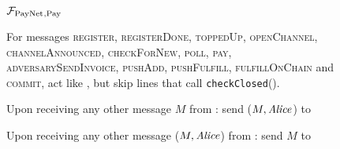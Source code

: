 \begin{figure}[!htbp]
  \begin{systembox}{$\mathcal{F}_{\mathrm{PayNet}}{}_{\mathrm{, Pay}}$}
    \begin{algorithmic}[1]
      \State For messages \textsc{register}, \textsc{registerDone},
      \textsc{toppedUp}, \textsc{openChannel}, \textsc{channelAnnounced},
      \textsc{checkForNew}, \textsc{poll}, \textsc{pay},
      \textsc{adversarySendInvoice}, \textsc{pushAdd}, \textsc{pushFulfill},
      \textsc{fulfillOnChain} and \textsc{commit}, act like \fpaynet{}, but skip
      lines that call \texttt{checkClosed}().
      \Statex

      \State Upon receiving any other message $M$ from \alice:
      \Indent
          \State send ($M, \mathit{Alice}$) to \simulator
        \EndIf
      \EndIndent
      \Statex

      \State Upon receiving any other message ($M, \mathit{Alice}$) from \simulator:
      \Indent
          \State send $M$ to \alice
        \EndIf
      \EndIndent
    \end{algorithmic}
  \end{systembox}
  \caption{}
  \label{alg:proof:fpaynet:pay}
\end{figure}

